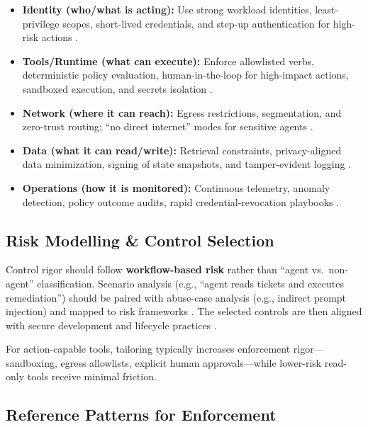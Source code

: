 \begin{TNtwocol}
      \begin{itemize}
            \item \textbf{Identity (who/what is acting):} Use strong workload identities, least-privilege scopes, short-lived credentials, and step-up authentication for high-risk actions \cite{NIST_SP800_52R2,NIST_SP800_12R1}.
            \item \textbf{Tools/Runtime (what can execute):} Enforce allowlisted verbs, deterministic policy evaluation, human-in-the-loop for high-impact actions, sandboxed execution, and secrets isolation \cite{NIST_SP800_162,NIST_SP800_218}.
            \item \textbf{Network (where it can reach):} Egress restrictions, segmentation, and zero-trust routing; ``no direct internet'' modes for sensitive agents \cite{NIST_SP800_207,CISA_ZTMM_v2}.
            \item \textbf{Data (what it can read/write):} Retrieval constraints, privacy-aligned data minimization, signing of state snapshots, and tamper-evident logging \cite{ISO_27002_2022,NSA_Data_Pillar_2024}.
            \item \textbf{Operations (how it is monitored):} Continuous telemetry, anomaly detection, policy outcome audits, rapid credential-revocation playbooks \cite{NIST_SP800_137,NIST_SP800_50R1}.
      \end{itemize}

      \subsection{Risk Modelling \& Control Selection}

      Control rigor should follow \textbf{workflow-based risk} rather than ``agent vs.\ non-agent'' classification. Scenario analysis (e.g., “agent reads tickets and executes remediation”) should be paired with abuse-case analysis (e.g., indirect prompt injection) and mapped to risk frameworks \cite{NIST_AI_RMF_100_1,NIST_GenAI_Profile_600_1,ISO_23894_2023}. The selected controls are then aligned with secure development and lifecycle practices \cite{NIST_SP800_218,NIST_SP800_50R1}.

      For action-capable tools, tailoring typically increases enforcement rigor—sandboxing, egress allowlists, explicit human approvals—while lower-risk read-only tools receive minimal friction.

      \subsection{Reference Patterns for Enforcement}


\end{TNtwocol}
